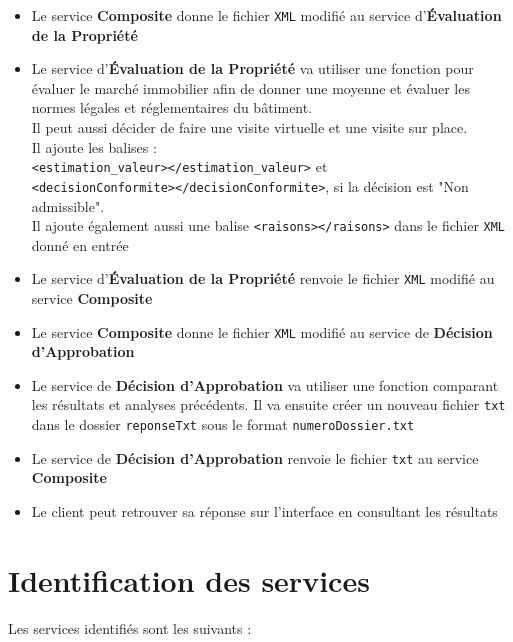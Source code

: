 \documentclass{article}
\begin{document}
\begin{itemize}
	  	\item Le service \textbf{Composite} donne le fichier \texttt{XML} modifié au service d'\textbf{Évaluation de la Propriété}
	  	
	  	\item Le service d'\textbf{Évaluation de la Propriété} va utiliser une fonction pour évaluer le marché immobilier afin de donner une moyenne et évaluer les normes légales et réglementaires du bâtiment. \\
	  	Il peut aussi décider de faire une visite virtuelle et une visite sur place. \\
	  	Il ajoute les balises : \\
	  	\texttt{<estimation\_valeur></estimation\_valeur>} et \\
	  	 \texttt{<decisionConformite></decisionConformite>}, si la décision est "Non admissible". \\
	  	Il ajoute également aussi une balise \texttt{<raisons></raisons>} dans le fichier \texttt{XML} donné en entrée
	  	
	  	\item Le service d'\textbf{Évaluation de la Propriété} renvoie le fichier \texttt{XML} modifié au service \textbf{Composite}
	  	
	  	\item Le service \textbf{Composite} donne le fichier \texttt{XML} modifié au service de \textbf{Décision d'Approbation}
	  	
	  	\item Le service de \textbf{Décision d’Approbation} va utiliser une fonction comparant les résultats et analyses précédents. Il va ensuite créer un nouveau fichier \texttt{txt} dans le dossier \texttt{reponseTxt} sous le format \texttt{numeroDossier.txt}
	  	
	  	\item Le service de \textbf{Décision d’Approbation} renvoie le fichier \texttt{txt} au service \textbf{Composite}
	  	
	  	\item Le client peut retrouver sa réponse sur l’interface en consultant les résultats
	  	
	  \end{itemize}
	
	\newpage
	
	\section{Identification des services}
		Les services identifiés sont les suivants : \\
		
\end{document}
